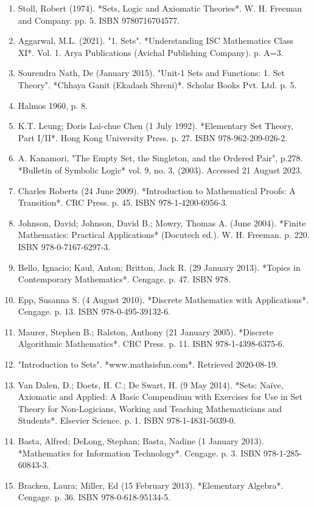 \begin{enumerate}
\item Stoll, Robert (1974). *Sets, Logic and Axiomatic Theories*. W. H. Freeman and Company. pp. 5. ISBN 9780716704577.  
\item Aggarwal, M.L. (2021). "1. Sets". *Understanding ISC Mathematics Class XI*. Vol. 1. Arya Publications (Avichal Publishing Company). p. A=3.  
\item Sourendra Nath, De (January 2015). "Unit-1 Sets and Functions: 1. Set Theory". *Chhaya Ganit (Ekadash Shreni)*. Scholar Books Pvt. Ltd. p. 5.  
\item Halmos 1960, p. 8.  
\item K.T. Leung; Doris Lai-chue Chen (1 July 1992). *Elementary Set Theory, Part I/II*. Hong Kong University Press. p. 27. ISBN 978-962-209-026-2.  
\item A. Kanamori, "The Empty Set, the Singleton, and the Ordered Pair", p.278. *Bulletin of Symbolic Logic* vol. 9, no. 3, (2003). Accessed 21 August 2023.  
\item Charles Roberts (24 June 2009). *Introduction to Mathematical Proofs: A Transition*. CRC Press. p. 45. ISBN 978-1-4200-6956-3.  
\item Johnson, David; Johnson, David B.; Mowry, Thomas A. (June 2004). *Finite Mathematics: Practical Applications* (Docutech ed.). W. H. Freeman. p. 220. ISBN 978-0-7167-6297-3.  
\item Bello, Ignacio; Kaul, Anton; Britton, Jack R. (29 January 2013). *Topics in Contemporary Mathematics*. Cengage. p. 47. ISBN 978.
\item Epp, Susanna S. (4 August 2010). *Discrete Mathematics with Applications*. Cengage. p. 13. ISBN 978-0-495-39132-6.  
\item Maurer, Stephen B.; Ralston, Anthony (21 January 2005). *Discrete Algorithmic Mathematics*. CRC Press. p. 11. ISBN 978-1-4398-6375-6.  
\item "Introduction to Sets". *www.mathsisfun.com*. Retrieved 2020-08-19.  
\item Van Dalen, D.; Doets, H. C.; De Swart, H. (9 May 2014). *Sets: Naïve, Axiomatic and Applied: A Basic Compendium with Exercises for Use in Set Theory for Non-Logicians, Working and Teaching Mathematicians and Students*. Elsevier Science. p. 1. ISBN 978-1-4831-5039-0.  
\item Basta, Alfred; DeLong, Stephan; Basta, Nadine (1 January 2013). *Mathematics for Information Technology*. Cengage. p. 3. ISBN 978-1-285-60843-3.  
\item Bracken, Laura; Miller, Ed (15 February 2013). *Elementary Algebra*. Cengage. p. 36. ISBN 978-0-618-95134-5.  

\end{enumerate}
